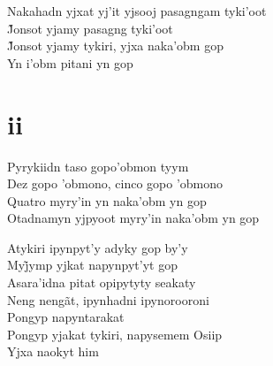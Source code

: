 \begin{linenumbers}
 
\noindent   Nakahadn yjxat yj'it yjsooj pasagngam tyki'oot\\
  J̃onsot yjamy pasagng tyki’oot\\
  J̃onsot yjamy tykiri, yjxa naka’obm gop\\
  Yn i’obm pitani yn gop
 
 
\medskip
\section{ii}

  \noindent Pyrykiidn taso gopo'obmon tyym\\
  Dez gopo 'obmono, cinco gopo 'obmono\\
  Quatro myry'in yn naka'obm yn gop\\
  Otadnamyn yjpyoot myry'in naka'obm yn gop
 
\end{linenumbers}

\bigskip

\begin{linenumbers}
 
\noindent   Atykiri ipynpyt'y adyky gop by'y\\
  Myj̃ymp yjkat napynpyt’yt gop\\
  Asara'idna pitat opipytyty seakaty\\
  Neng nengãt, ipynhadni ipynorooroni\\
  Pongyp napyntarakat\\
  Pongyp yjakat tykiri, napysemem Osiip\\
  Yjxa naokyt him
 
\end{linenumbers}

